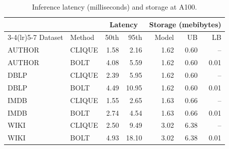 \begin{table}[!t]
\centering
\small
\setlength{\tabcolsep}{1.5pt}
\caption{Inference latency (milliseconds) and storage at A100.}
\label{tab:inference}
\begin{tabular*}{\columnwidth}{@{\extracolsep{\fill}}llrrrrr@{}}
\toprule
 & & \multicolumn{2}{c}{Latency} & \multicolumn{3}{c}{Storage (mebibytes)} \\
\cmidrule(lr){3-4}\cmidrule(lr){5-7}
Dataset & Method & 50th & 95th & Model & UB & LB \\
\midrule
AUTHOR & CLIQUE & 1.58 & 2.16 & 1.62 & 0.60 & -- \\
AUTHOR & BOLT & 4.08 & 5.59 & 1.62 & 0.60 & 0.01 \\
DBLP & CLIQUE & 2.39 & 5.95 & 1.62 & 0.60 & -- \\
DBLP & BOLT & 4.49 & 10.95 & 1.62 & 0.60 & 0.01 \\
IMDB & CLIQUE & 1.55 & 2.65 & 1.63 & 0.66 & -- \\
IMDB & BOLT & 2.74 & 4.54 & 1.63 & 0.66 & 0.01 \\
WIKI & CLIQUE & 2.50 & 9.49 & 3.02 & 6.38 & -- \\
WIKI & BOLT & 4.93 & 18.10 & 3.02 & 6.38 & 0.01 \\
\bottomrule
\end{tabular*}
\end{table}
